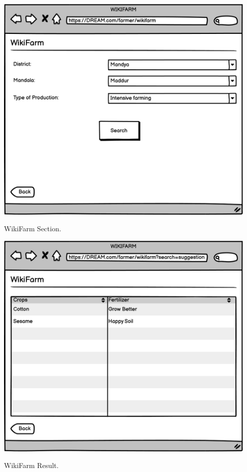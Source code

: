 \vspace{0.5cm}
\begin{minipage}{.5\textwidth}
	\centering
	\includegraphics[width=0.95\textwidth]{Images/Mockup/Farmer/13FarmerWikiFarm.png}
	\captionsetup{type=figure}
	\caption{WikiFarm Section.}
\end{minipage}%
\begin{minipage}{.5\textwidth}
	\centering
	\includegraphics[width=0.95\textwidth]{Images/Mockup/Farmer/14FarmerWikiFarmSuggestions.png}
	\captionsetup{type=figure}
	\caption{WikiFarm Result.}
\end{minipage}
